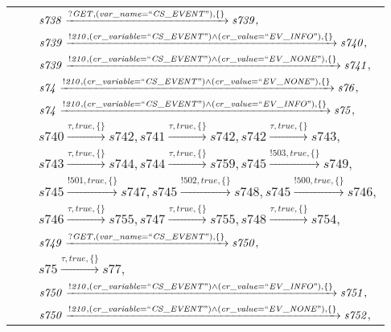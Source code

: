 \begin{tabular}{lcl}
& & $\mathit{s738}\xrightarrow{\mathit{?GET}, \mathit{(var\_name = ``CS\_EVENT")}, \{\}}\mathit{s739},$ \\
& & $\mathit{s739}\xrightarrow{\mathit{!210}, \mathit{(cr\_variable = ``CS\_EVENT") \land (cr\_value = ``EV\_INFO")}, \{\}}\mathit{s740},$ \\
& & $\mathit{s739}\xrightarrow{\mathit{!210}, \mathit{(cr\_variable = ``CS\_EVENT") \land (cr\_value = ``EV\_NONE")}, \{\}}\mathit{s741},$ \\
& & $\mathit{s74}\xrightarrow{\mathit{!210}, \mathit{(cr\_variable = ``CS\_EVENT") \land (cr\_value = ``EV\_NONE")}, \{\}}\mathit{s76},$ \\
& & $\mathit{s74}\xrightarrow{\mathit{!210}, \mathit{(cr\_variable = ``CS\_EVENT") \land (cr\_value = ``EV\_INFO")}, \{\}}\mathit{s75},$ \\
& & $\mathit{s740}\xrightarrow{\mathit{\tau}, \mathit{true}, \{\}}\mathit{s742},\mathit{s741}\xrightarrow{\mathit{\tau}, \mathit{true}, \{\}}\mathit{s742},\mathit{s742}\xrightarrow{\mathit{\tau}, \mathit{true}, \{\}}\mathit{s743},$ \\
& & $\mathit{s743}\xrightarrow{\mathit{\tau}, \mathit{true}, \{\}}\mathit{s744},\mathit{s744}\xrightarrow{\mathit{\tau}, \mathit{true}, \{\}}\mathit{s759},\mathit{s745}\xrightarrow{\mathit{!503}, \mathit{true}, \{\}}\mathit{s749},$ \\
& & $\mathit{s745}\xrightarrow{\mathit{!501}, \mathit{true}, \{\}}\mathit{s747},\mathit{s745}\xrightarrow{\mathit{!502}, \mathit{true}, \{\}}\mathit{s748},\mathit{s745}\xrightarrow{\mathit{!500}, \mathit{true}, \{\}}\mathit{s746},$ \\
& & $\mathit{s746}\xrightarrow{\mathit{\tau}, \mathit{true}, \{\}}\mathit{s755},\mathit{s747}\xrightarrow{\mathit{\tau}, \mathit{true}, \{\}}\mathit{s755},\mathit{s748}\xrightarrow{\mathit{\tau}, \mathit{true}, \{\}}\mathit{s754},$ \\
& & $\mathit{s749}\xrightarrow{\mathit{?GET}, \mathit{(var\_name = ``CS\_EVENT")}, \{\}}\mathit{s750},$ \\
& & $\mathit{s75}\xrightarrow{\mathit{\tau}, \mathit{true}, \{\}}\mathit{s77},$ \\
& & $\mathit{s750}\xrightarrow{\mathit{!210}, \mathit{(cr\_variable = ``CS\_EVENT") \land (cr\_value = ``EV\_INFO")}, \{\}}\mathit{s751},$ \\
& & $\mathit{s750}\xrightarrow{\mathit{!210}, \mathit{(cr\_variable = ``CS\_EVENT") \land (cr\_value = ``EV\_NONE")}, \{\}}\mathit{s752},$ \\

\end{tabular}
